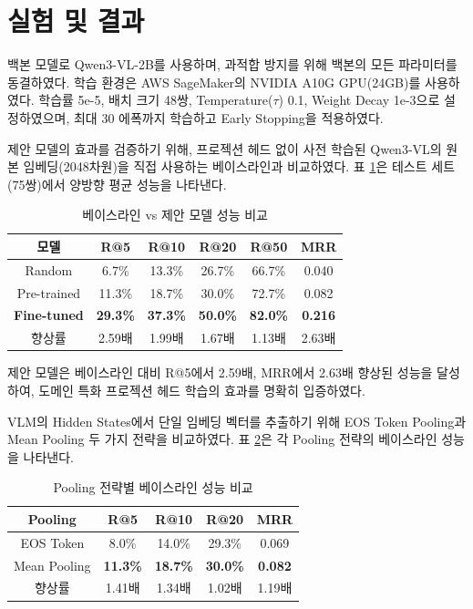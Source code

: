 \section{실험 및 결과}

백본 모델로 Qwen3-VL-2B를 사용하며, 과적합 방지를 위해 백본의 모든 파라미터를 동결하였다. 학습 환경은 AWS SageMaker의 NVIDIA A10G GPU(24GB)를 사용하였다. 학습률 5e-5, 배치 크기 48쌍, Temperature($\tau$) 0.1, Weight Decay 1e-3으로 설정하였으며, 최대 30 에폭까지 학습하고 Early Stopping을 적용하였다.

제안 모델의 효과를 검증하기 위해, 프로젝션 헤드 없이 사전 학습된 Qwen3-VL의 원본 임베딩(2048차원)을 직접 사용하는 베이스라인과 비교하였다. 표 \ref{tab:baseline}은 테스트 세트(75쌍)에서 양방향 평균 성능을 나타낸다.

\begin{table}[h]
\centering
\caption{베이스라인 vs 제안 모델 성능 비교}
\label{tab:baseline}
\begin{tabular}{cccccc}
\toprule
\textbf{모델} & \textbf{R@5} & \textbf{R@10} & \textbf{R@20} & \textbf{R@50} & \textbf{MRR} \\
\midrule
Random & 6.7\% & 13.3\% & 26.7\% & 66.7\% & 0.040 \\
Pre-trained & 11.3\% & 18.7\% & 30.0\% & 72.7\% & 0.082 \\
\textbf{Fine-tuned} & \textbf{29.3\%} & \textbf{37.3\%} & \textbf{50.0\%} & \textbf{82.0\%} & \textbf{0.216} \\
향상률 & 2.59배 & 1.99배 & 1.67배 & 1.13배 & 2.63배 \\
\bottomrule
\end{tabular}
\end{table}

제안 모델은 베이스라인 대비 R@5에서 2.59배, MRR에서 2.63배 향상된 성능을 달성하여, 도메인 특화 프로젝션 헤드 학습의 효과를 명확히 입증하였다.

VLM의 Hidden States에서 단일 임베딩 벡터를 추출하기 위해 EOS Token Pooling과 Mean Pooling 두 가지 전략을 비교하였다. 표 \ref{tab:pooling}은 각 Pooling 전략의 베이스라인 성능을 나타낸다.

\begin{table}[h]
\centering
\caption{Pooling 전략별 베이스라인 성능 비교}
\label{tab:pooling}
\begin{tabular}{ccccc}
\toprule
\textbf{Pooling} & \textbf{R@5} & \textbf{R@10} & \textbf{R@20} & \textbf{MRR} \\
\midrule
EOS Token & 8.0\% & 14.0\% & 29.3\% & 0.069 \\
Mean Pooling & \textbf{11.3\%} & \textbf{18.7\%} & \textbf{30.0\%} & \textbf{0.082} \\
향상률 & 1.41배 & 1.34배 & 1.02배 & 1.19배 \\
\bottomrule
\end{tabular}
\end{table}

